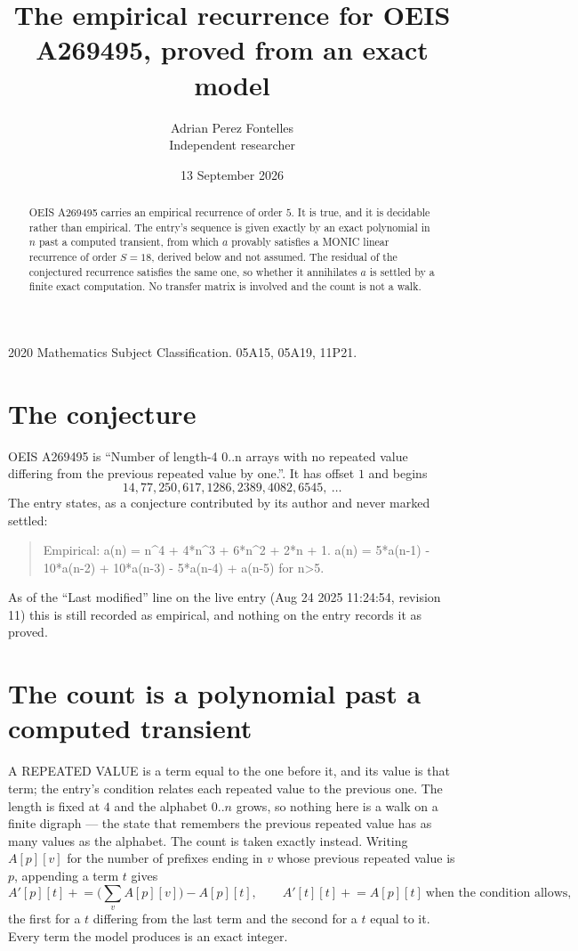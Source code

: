 \documentclass[11pt,a4paper]{article}
\title{The empirical recurrence for OEIS A269495, proved from an exact model}
\author{Adrian Perez Fontelles\\ \small Independent researcher}
\date{13 September 2026}
\theoremstyle{plain}
\theoremstyle{definition}
\begin{document}
\maketitle

\begin{abstract}
OEIS A269495 carries an empirical recurrence of order $5$. It is true, and it is
decidable rather than empirical. The entry's sequence is given exactly by an exact polynomial in $n$ past a computed transient, from
which $a$ provably satisfies a MONIC linear recurrence of order $S=18$, derived below and not
assumed. The residual of the conjectured recurrence satisfies the same one, so whether it
annihilates $a$ is settled by a finite exact computation. No transfer matrix is involved and
the count is not a walk.
\end{abstract}

\noindent\small 2020 Mathematics Subject Classification. 05A15, 05A19, 11P21.\normalsize

\section{The conjecture}

OEIS A269495 is ``Number of length-4 0..n arrays with no repeated value differing from the previous repeated value by one.''. It has offset $1$ and begins
\[
14, 77, 250, 617, 1286, 2389, 4082, 6545,\ \dots
\]
The entry states, as a conjecture contributed by its author and never marked settled:
\begin{quote}
Empirical: a(n) = n\^{}4 + 4*n\^{}3 + 6*n\^{}2 + 2*n + 1. a(n) = 5*a(n-1) - 10*a(n-2) + 10*a(n-3) - 5*a(n-4) + a(n-5) for n>5.
\end{quote}
As of the ``Last modified'' line on the live entry (Aug 24 2025 11:24:54, revision 11)
this is still recorded as empirical, and nothing on the entry records it as proved.

\section{The count is a polynomial past a computed transient}

A REPEATED VALUE is a term equal to the one before it, and its value is that term; the entry's
condition relates each repeated value to the previous one. The length is fixed at $4$ and the
alphabet $0..n$ grows, so nothing here is a walk on a finite digraph --- the state that
remembers the previous repeated value has as many values as the alphabet. The count is taken
exactly instead. Writing $A[p][v]$ for the number of prefixes ending in $v$ whose previous
repeated value is $p$, appending a term $t$ gives
\[
A'[p][t] \mathrel{+}= \Big(\sum_v A[p][v]\Big) - A[p][t],
\qquad
A'[t][t] \mathrel{+}= A[p][t]\ \text{when the condition allows},
\]
the first for a $t$ differing from the last term and the second for a $t$ equal to it. Every
term the model produces is an exact integer.
\end{document}
